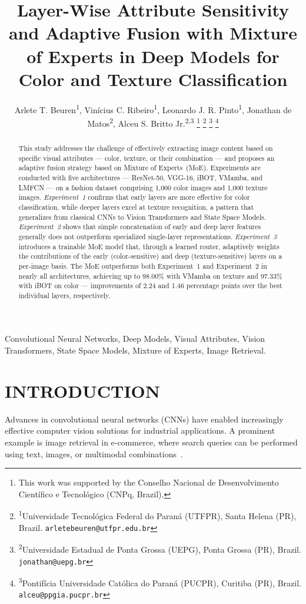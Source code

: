 \documentclass[letterpaper, 10 pt, conference]{ieeeconf}
\title{\LARGE \bf
Layer-Wise Attribute Sensitivity and Adaptive Fusion with Mixture of
Experts in Deep Models for Color and Texture Classification
}
\author{
    Arlete T. Beuren\textsuperscript{1},
    Vinícius C. Ribeiro\textsuperscript{1},
    Leonardo J. R. Pinto\textsuperscript{1},
    Jonathan de Matos\textsuperscript{2},
    Alceu S. Britto Jr.\textsuperscript{2,3}%
    \thanks{This work was supported by the Conselho Nacional de
            Desenvolvimento Cient\'{i}fico e Tecnol\'{o}gico (CNPq, Brazil).}%
    \thanks{\textsuperscript{1}Universidade Tecnol\'{o}gica Federal do
            Paran\'{a} (UTFPR), Santa Helena (PR), Brazil.
            \texttt{arletebeuren@utfpr.edu.br}}%
    \thanks{\textsuperscript{2}Universidade Estadual de Ponta Grossa (UEPG),
            Ponta Grossa (PR), Brazil.
            \texttt{jonathan@uepg.br}}%
    \thanks{\textsuperscript{3}Pontif\'{i}cia Universidade Cat\'{o}lica do
            Paran\'{a} (PUCPR), Curitiba (PR), Brazil.
            \texttt{alceu@ppgia.pucpr.br}}%
}
\begin{document}
\maketitle
\thispagestyle{empty}
\pagestyle{empty}

\begin{abstract}

This study addresses the challenge of effectively extracting image content
based on specific visual attributes — color, texture, or their combination
— and proposes an adaptive fusion strategy based on Mixture of
Experts~(MoE).
Experiments are conducted with five architectures — ResNet-50, VGG-16,
iBOT, VMamba, and LMFCN — on a fashion dataset comprising 1,000 color
images and 1,000 texture images.
\emph{Experiment~1} confirms that early layers are more effective for
color classification, while deeper layers excel at texture recognition,
a pattern that generalizes from classical CNNs to Vision Transformers and
State Space Models.
\emph{Experiment~2} shows that simple concatenation of early and deep
layer features generally does not outperform specialized single-layer
representations.
\emph{Experiment~3} introduces a trainable MoE model that, through a
learned router, adaptively weights the contributions of the early
(color-sensitive) and deep (texture-sensitive) layers on a per-image
basis.
The MoE outperforms both Experiment~1 and Experiment~2 in nearly all
architectures, achieving up to 98.00\% with VMamba on texture and 97.33\%
with iBOT on color — improvements of 2.24 and 1.46 percentage points over
the best individual layers, respectively.

\end{abstract}

\begin{IEEEkeywords}
Convolutional Neural Networks, Deep Models, Visual Attributes, Vision
Transformers, State Space Models, Mixture of Experts, Image Retrieval.
\end{IEEEkeywords}

\section{INTRODUCTION}

Advances in convolutional neural networks (CNNs) have enabled increasingly
effective computer vision solutions for industrial applications.
A prominent example is image retrieval in e-commerce, where search queries
can be performed using text, images, or multimodal
combinations~\cite{b1}.
\end{document}
